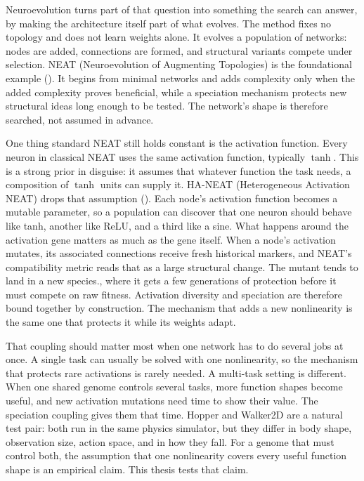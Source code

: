 \documentclass[12pt]{article}
\begin{document}
Neuroevolution turns part of that question into something the search can answer, by making the architecture itself part of what evolves.
The method fixes no topology and does not learn weights alone.
It evolves a population of networks: nodes are added, connections are formed, and structural variants compete under selection.
NEAT (Neuroevolution of Augmenting Topologies) is the foundational example (\cite{stanley_evolving_2002}).
It begins from minimal networks and adds complexity only when the added complexity proves beneficial, while a speciation mechanism protects new structural ideas long enough to be tested.
The network's shape is therefore searched, not assumed in advance.

One thing standard NEAT still holds constant is the activation function.
Every neuron in classical NEAT uses the same activation function, typically $\tanh$.
This is a strong prior in disguise: it assumes that whatever function the task needs, a composition of $\tanh$ units can supply it.
HA-NEAT (Heterogeneous Activation NEAT) drops that assumption (\cite{hagg_evolving_2017}).
Each node's activation function becomes a mutable parameter, so a population can discover that one neuron should behave like tanh, another like ReLU, and a third like a sine.
What happens around the activation gene matters as much as the gene itself.
When a node's activation mutates, its associated connections receive fresh historical markers, and NEAT's compatibility metric reads that as a large structural change.
The mutant tends to land in a new species., where it gets a few generations of protection before it must compete on raw fitness.
Activation diversity and speciation are therefore bound together by construction. The mechanism that adds a new nonlinearity is the same one that protects it while its weights adapt.


That coupling should matter most when one network has to do several jobs at once.
A single task can usually be solved with one nonlinearity, so the mechanism that protects rare activations is rarely needed.
A multi-task setting is different.
When one shared genome controls several tasks, more function shapes become useful, and new activation mutations need time to show their value.
The speciation coupling gives them that time.
Hopper and Walker2D are a natural test pair: both run in the same physics simulator, but they differ in body shape, observation size, action space, and in how they fall.
For a genome that must control both, the assumption that one nonlinearity covers every useful function shape is an empirical claim.
This thesis tests that claim.
\end{document}
